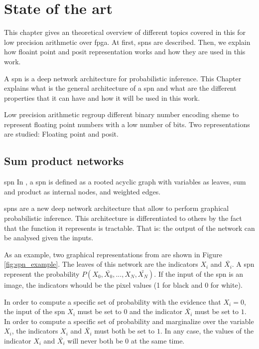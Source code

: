 
\chapter{State of the art}
\label{cha:soa}

This chapter gives an theoretical overview of different topics covered in this for low precision arithmetic over \gls{fpga}. At first, \glspl{spn} are described. Then, we explain how floaint point and posit representation works and how they are used in this work.

A \gls{spn} is a deep network architecture for probabilistic inference. This Chapter explains what is the general architecture of a \gls{spn} and what are the different properties that it can have and how it will be used in this work.

Low precision arithmetic regroup different binary number encoding sheme to represent floating point numbers with a low number of bits. Two representations are studied: Floating point and posit.


\section{Sum product networks}

\begin{definition}{\Gls{spn}}
In \cite{spns}, a \gls{spn} is defined as a rooted acyclic graph with variables as leaves, sum and product as internal nodes, and weighted edges.
\end{definition}

\Glspl{spn} are a new deep network architecture that allow to perform graphical probabilistic inference. This architecture is differentiated to others by the fact that the function it represents is tractable. That is: the output of the network can be analysed given the inputs.

As an example, two graphical representations from \cite{spns} are shown in Figure \ref{fig:spn_example}. The leaves of this network are the indicators $X_i$ and $\bar{X_i}$. A \gls{spn} represent the probability $P(X_0, \bar{X_0}, ...,  X_N, \bar{X_N})$. If the input of the \gls{spn} is an image, the indicators whould be the pixel values (1 for black and 0 for white).

In order to compute a specific set of probability with the evidence that $X_i=0$, the input of the \gls{spn} $X_i$ must be set to $0$ and the indicator $\bar{X_i}$ must be set to $1$. In order to compute a specific set of probability and marginalize over the variable $X_i$, the indicators $X_i$ and $\bar{X_i}$ must both be set to $1$. In any case, the values of the indicator $X_i$ and $\bar{X_i}$ will never both be $0$ at the same time.

